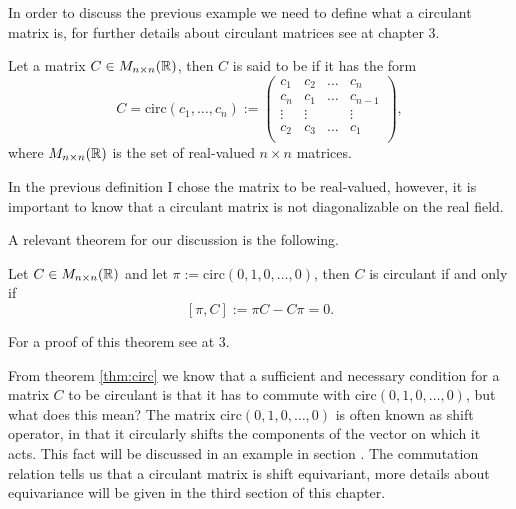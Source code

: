 \documentclass[../3.tex]{subfiles}
\begin{document}
    {\color{blue}
    In order to discuss the previous example we need to define what a circulant matrix is, for further details about circulant matrices see \cite{circulant} at chapter 3.
    
    \begin{defn}
        Let a matrix $C \in M_{n \times n}(\mathbb{R})$, then $C$ is said to be  if it has the form 
        \[ C = \text{circ}(c_1, \dots, c_n) := 
        \begin{pmatrix}
            c_1 & c_2 & \dots & c_n \\
            c_n & c_1 & \dots & c_{n-1}\\
            \vdots & \vdots &  & \vdots \\
            c_2 & c_3 & \dots & c_1 \\
        \end{pmatrix}, \] 
        where $M_{n \times n}(\mathbb{R})$ is the set of real-valued $n \times n$ matrices.
    \end{defn}

    \begin{rem}
        In the previous definition I chose the matrix to be real-valued, however, it is important to know that a circulant matrix is not
        diagonalizable on the real field.
    \end{rem}

    A relevant theorem for our discussion is the following.

    \begin{thm}
        Let $C \in M_{n \times n}(\mathbb{R})$ and let $\pi := \text{circ}(0,1,0,\dots,0)$, then $C$ is circulant if and only if
        \[ [\pi, C] := \pi C - C \pi = 0 . \]
        \label{thm:circ}
    \end{thm}
    
    For a proof of this theorem see \cite{circulant} at 3.

    From theorem \ref{thm:circ} we know that a sufficient and necessary condition for a matrix $C$ to be circulant is that it has to commute
    with $\text{circ}(0,1,0,\dots,0)$, but what does this mean?
    The matrix $\text{circ}(0,1,0,\dots,0)$ is often known as shift operator, in that it circularly shifts the components of the vector on which it acts.
    This fact will be discussed in an example in section \cite{sec:3:3}.
    The commutation relation tells us that a circulant matrix is shift equivariant, more details about equivariance will be given in the third section
    of this chapter.}
\end{document}
